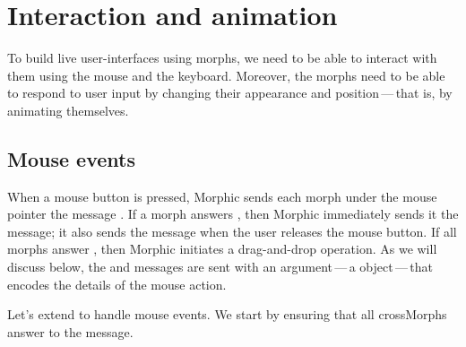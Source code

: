 \documentclass[a4paper,10pt,twoside]{book}
\begin{document}



\section{Interaction and animation}

To build live user-interfaces using morphs, we need to be able to interact with them using the mouse and the keyboard.
Moreover, the morphs need to be able to respond to user input by changing their appearance and position\,---\,that is, by animating themselves.


\subsection{Mouse events}

When a mouse button is pressed, Morphic sends each morph under the mouse pointer the message .
If a morph answers , then Morphic immediately sends it the  message; it also sends the  message when the user releases the mouse button.
If all morphs answer , then Morphic initiates a drag-and-drop operation.
As we will discuss below, the  and  messages are sent with an argument\,---\,a  object\,---\,that encodes the details of the mouse action.

Let's extend  to handle mouse events.  
We start by ensuring that all crossMorphs answer  to the  message. 
\end{document}
